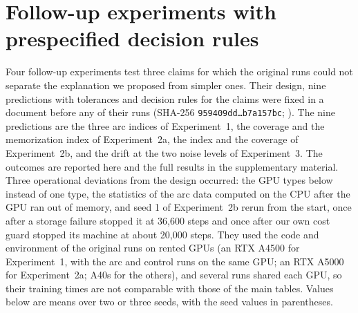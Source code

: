 \section{Follow-up experiments with prespecified decision rules}
\label{app:r1}
Four follow-up experiments test three claims for which the original runs could not separate the explanation we proposed from simpler ones. Their design, nine predictions with tolerances and decision rules for the claims were fixed in a document before any of their runs (SHA-256 \texttt{959409dd\ldots{}b7a157bc}; ). The nine predictions are the three arc indices of Experiment~1, the coverage and the memorization index of Experiment~2a, the index and the coverage of Experiment~2b, and the drift at the two noise levels of Experiment~3. The outcomes are reported here and the full results in the supplementary material. Three operational deviations from the design occurred: the GPU types below instead of one type, the statistics of the arc data computed on the CPU after the GPU ran out of memory, and seed 1 of Experiment~2b rerun from the start, once after a storage failure stopped it at 36{,}600 steps and once after our own cost guard stopped its machine at about 20{,}000 steps. They used the code and environment of the original runs on rented GPUs (an RTX A4500 for Experiment~1, with the arc and control runs on the same GPU; an RTX A5000 for Experiment~2a; A40s for the others), and several runs shared each GPU, so their training times are not comparable with those of the main tables. Values below are means over two or three seeds, with the seed values in parentheses.

